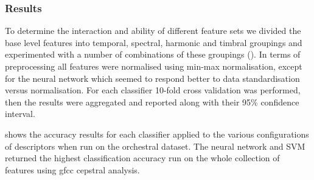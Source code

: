 {{{{{\subsubsection{Results}

To determine the interaction and ability of different feature sets  we divided the base level features into temporal, spectral, harmonic and timbral groupings and experimented with a number of combinations of these groupings ().  In terms of preprocessing all features were normalised using min-max normalisation, except for the neural network which seemed to respond better to data standardisation versus normalisation. For each classifier 10-fold cross validation was performed, then the results were aggregated and reported along with their 95\% confidence interval.

 shows the accuracy results for each classifier applied to the various configurations of descriptors when run on the orchestral dataset. The neural network and SVM returned the highest classification accuracy run on the whole collection of features using \acrshort{gfcc} cepstral analysis.

}}}}}
